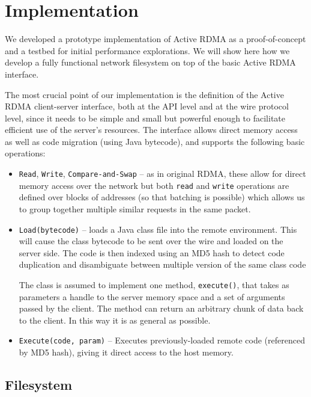 \documentclass[10pt]{article}
\begin{document}
\section{Implementation}

We developed a prototype implementation of Active RDMA as a
proof-of-concept and a testbed for initial performance
explorations. We will show here how we develop a fully functional
network filesystem on top of the basic Active RDMA interface.

The most crucial point of our implementation is the definition of the
Active RDMA client-server interface, both at the API level and at the
wire protocol level, since it needs to be simple and small but
powerful enough to facilitate efficient use of the server's
resources. The interface allows direct memory access as well as code
migration (using Java bytecode), and supports the following basic
operations:

\begin{itemize}
  \item {\tt Read}, {\tt Write}, {\tt Compare-and-Swap} -- as in
    original RDMA, these allow for direct memory access over the
    network but both {\tt read} and {\tt write} operations are defined
    over blocks of addresses (so that batching is possible) which
    allows us to group together multiple similar requests in the same
    packet.
  \item {\tt Load(bytecode)} -- loads a Java class file into the
    remote environment. This will cause the class bytecode to be sent
    over the wire and loaded on the server side. The code is then
    indexed using an MD5 hash to detect code duplication and
    disambiguate between multiple version of the same class code
    
    The class is assumed to implement one method, {\tt execute()},
    that takes as parameters a handle to the server memory space and a
    set of arguments passed by the client. The method can return an
    arbitrary chunk of data back to the client. In this way it is as
    general as possible.
    
  \item {\tt Execute(code, param)} -- Executes previously-loaded
    remote code (referenced by MD5 hash), giving it direct access to
    the host memory.
     
\end{itemize}

\subsection{Filesystem}
\end{document}
